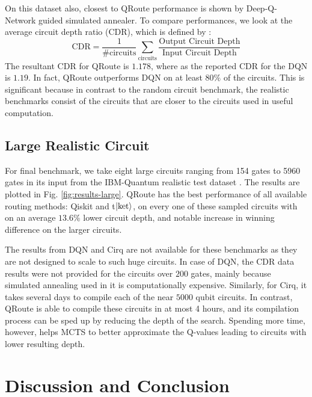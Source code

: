On this dataset also, closest to QRoute performance is shown by Deep-Q-Network guided simulated annealer. To compare performances, we look at the average circuit depth ratio (CDR), which is defined by \cite{qroute_dqn2}:
\begin{equation}
    \text{CDR} = \frac{1}{\textrm{\#circuits}} \sum_{\textrm{circuits}} \frac{\textrm{Output Circuit Depth}}{\textrm{Input Circuit Depth}}
    \label{eq:CDR}
\end{equation}
The resultant CDR for QRoute is $1.178$, where as the reported CDR for the DQN is $1.19$. In fact, QRoute outperforms DQN on at least $80\%$ of the circuits. This is significant because in contrast to the random circuit benchmark, the realistic benchmarks consist of the circuits that are closer to the circuits used in useful computation.


\subsection{\label{sec:results-realistic}Large Realistic Circuit}

For final benchmark, we take eight large circuits ranging from 154 gates to 5960 gates in its input from the IBM-Quantum realistic test dataset \cite{data_realistic}. The results are plotted in Fig.  \ref{fig:results-large}. QRoute has the best performance of all available routing methods: Qiskit and t$\ket{\text{ket}}$, on every one of these sampled circuits with on an average $13.6\%$ lower circuit depth, and notable increase in winning difference on the larger circuits.



The results from DQN and Cirq are not available for these benchmarks as they are not designed to scale to such huge circuits. In case of DQN, the CDR data results were not provided for the circuits over $200$ gates, mainly because simulated annealing used in it is computationally expensive. Similarly, for Cirq, it takes several days to compile each of the near $5000$ qubit circuits. In contrast, QRoute is able to compile these circuits in at most 4 hours, and its compilation process can be sped up by reducing the depth of the search. Spending more time, however, helps MCTS to better approximate the Q-values leading to circuits with lower resulting depth.



\section{\label{sec:discussion-conclusion}Discussion and Conclusion}

